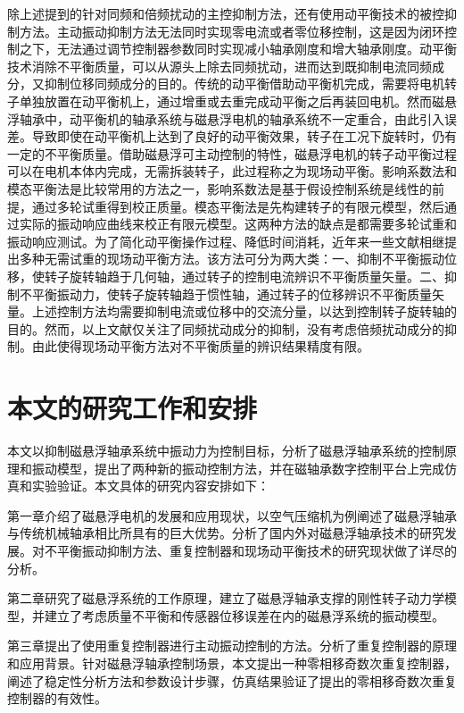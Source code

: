 除上述提到的针对同频和倍频扰动的主控抑制方法，还有使用动平衡技术的被控抑制方法。主动振动抑制方法无法同时实现零电流或者零位移控制，这是因为闭环控制之下，无法通过调节控制器参数同时实现减小轴承刚度和增大轴承刚度。动平衡技术消除不平衡质量，可以从源头上除去同频扰动，进而达到既抑制电流同频成分，又抑制位移同频成分的目的。传统的动平衡借助动平衡机完成，需要将电机转子单独放置在动平衡机上，通过增重或去重完成动平衡之后再装回电机。然而磁悬浮轴承中，动平衡机的轴承系统与磁悬浮电机的轴承系统不一定重合，由此引入误差。导致即使在动平衡机上达到了良好的动平衡效果，转子在工况下旋转时，仍有一定的不平衡质量。借助磁悬浮可主动控制的特性，磁悬浮电机的转子动平衡过程可以在电机本体内完成，无需拆装转子，此过程称之为现场动平衡。影响系数法和模态平衡法是比较常用的方法之一，影响系数法是基于假设控制系统是线性的前提，通过多轮试重得到校正质量\cite{john2009relationship,ranjan2019application}。模态平衡法是先构建转子的有限元模型，然后通过实际的振动响应曲线来校正有限元模型。这两种方法的缺点是都需要多轮试重和振动响应测试\cite{wang2014field}。为了简化动平衡操作过程、降低时间消耗，近年来一些文献相继提出多种无需试重的现场动平衡方法。该方法可分为两大类：一、抑制不平衡振动位移，使转子旋转轴趋于几何轴，通过转子的控制电流辨识不平衡质量矢量\cite{fang2013field,liu2015field}。二、抑制不平衡振动力，使转子旋转轴趋于惯性轴，通过转子的位移辨识不平衡质量矢量\cite{xu2015field}。上述控制方法均需要抑制电流或位移中的交流分量，以达到控制转子旋转轴的目的。然而，以上文献仅关注了同频扰动成分的抑制，没有考虑倍频扰动成分的抑制。由此使得现场动平衡方法对不平衡质量的辨识结果精度有限。

\section{本文的研究工作和安排}
本文以抑制磁悬浮轴承系统中振动力为控制目标，分析了磁悬浮轴承系统的控制原理和振动模型，提出了两种新的振动控制方法，并在磁轴承数字控制平台上完成仿真和实验验证。本文具体的研究内容安排如下：

第一章介绍了磁悬浮电机的发展和应用现状，以空气压缩机为例阐述了磁悬浮轴承与传统机械轴承相比所具有的巨大优势。分析了国内外对磁悬浮轴承技术的研究发展。对不平衡振动抑制方法、重复控制器和现场动平衡技术的研究现状做了详尽的分析。

第二章研究了磁悬浮系统的工作原理，建立了磁悬浮轴承支撑的刚性转子动力学模型，并建立了考虑质量不平衡和传感器位移误差在内的磁悬浮系统的振动模型。

第三章提出了使用重复控制器进行主动振动控制的方法。分析了重复控制器的原理和应用背景。针对磁悬浮轴承控制场景，本文提出一种零相移奇数次重复控制器，阐述了稳定性分析方法和参数设计步骤，仿真结果验证了提出的零相移奇数次重复控制器的有效性。

